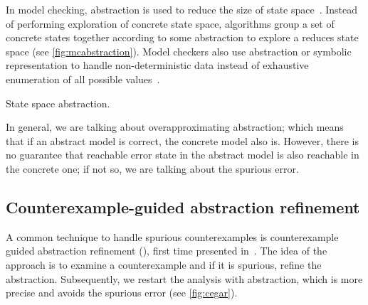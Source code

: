 In model checking, abstraction is used to reduce the size of state space~\cite{Pelnek2006}.
Instead of performing exploration of concrete state space, algorithms group a
set of concrete states together according to some abstraction to explore a
reduces state space (see \autoref{fig:mcabstraction}). Model checkers also use
abstraction or symbolic representation to handle non-deterministic data instead
of exhaustive enumeration of all possible values~\cite{Mrazek2016}.

\begin{marginfigure}


\caption{State space abstraction.}
\label{fig:mcabstraction}
\end{marginfigure}

In general, we are talking about overapproximating abstraction; which means
that if an abstract model is correct, the concrete model also is. However,
there is no guarantee that reachable error state in the abstract model is also
reachable in the concrete one; if not so, we are talking about the spurious error.

\subsection{Counterexample-guided abstraction refinement}

A common technique to handle spurious counterexamples is counterexample guided
abstraction refinement (\cegar), first time presented in~\cite{Clarke2000}.
The idea of the \cegar approach is to examine a counterexample and if it is spurious,
refine the abstraction. Subsequently, we restart the analysis with abstraction,
which is more precise and avoids the spurious error (see \autoref{fig:cegar}).

